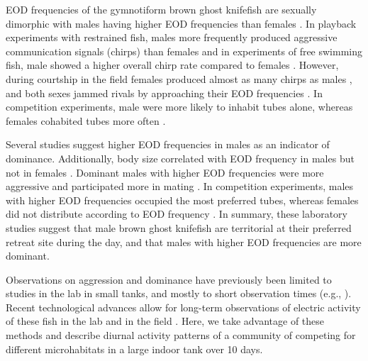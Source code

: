 EOD frequencies of the gymnotiform brown ghost knifefish \lepto{} are sexually dimorphic with males having higher EOD frequencies than females \citep{Meyer1987}. In playback experiments with restrained fish, males more frequently produced aggressive communication signals (chirps) than females \citep{ZupancMaler1993, Bastian2001} and in experiments of free swimming fish, male \lepto{} showed a higher overall chirp rate compared to females \citep{Dunlap2002,Hupe2008}. However, during courtship in the field females produced almost as many chirps as males \citep{Henninger2018}, and both sexes jammed rivals by approaching their EOD frequencies \citep{Tallarovic2002}. In competition experiments, male \lepto{} were
more likely to inhabit tubes alone, whereas females cohabited tubes more often \citep{Dunlap2002}.

Several studies suggest higher EOD frequencies in males as an indicator of dominance. Additionally, body size correlated with EOD frequency in males \citep{Triefenbach2008, Fugere2011} but not in females \citep{Dunlap2002}. Dominant males with higher EOD frequencies were more aggressive \citep{Fugere2011} and participated more in mating
\citep{Hagedorn1985, Henninger2018}. In competition experiments, males with higher EOD frequencies occupied the most preferred tubes, whereas females did not distribute according to EOD frequency \citep{Dunlap2002}. In summary, these laboratory studies suggest that male
brown ghost knifefish are territorial at their preferred retreat site during the day, and that males with higher EOD frequencies are more dominant.

Observations on aggression and dominance have previously been limited to studies in the lab in small tanks, and mostly to short observation times (e.g., \citealp{Hopkins1974, Hagedorn1985, Nelson1999, Tallarovic2005, Triefenbach2008, Hupe2008}). Recent technological advances allow for long-term observations of electric activity of these fish in the lab and in the field \citep{Henninger2018, Madhav2018}. Here, we take advantage of these methods and describe diurnal activity patterns of a community of \lepto{} competing for different
microhabitats in a large indoor tank over 10 days.

